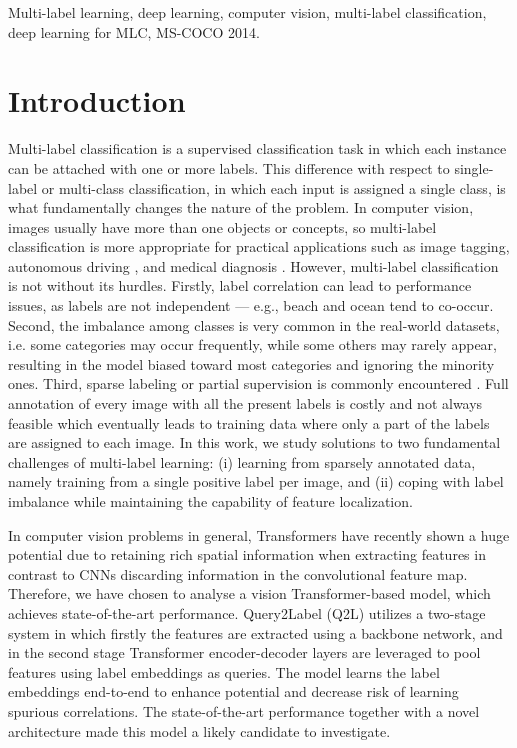 \documentclass[lettersize,journal]{IEEEtran}
\begin{document}
\begin{IEEEkeywords}
Multi-label learning, deep learning, computer vision, multi-label
classification, deep learning for MLC, MS-COCO 2014. 

\end{IEEEkeywords}


\section{Introduction}

Multi-label classification is a supervised classification task in which each instance can be attached with one or more labels. This difference with respect to single-label or multi-class classification, in which each input is assigned a single class, is what fundamentally changes the nature of the problem. In computer vision, images usually have more than one objects or concepts, so multi-label classification is more appropriate for practical applications such as image tagging, autonomous driving \cite{WU2024105189}, and medical diagnosis \cite{ge2018chestxraysclassificationmultilabel}.
However, multi-label classification is not without its hurdles. Firstly, label correlation can lead to performance issues, as labels are not independent — e.g., beach and ocean tend to co-occur. Second, the imbalance among classes is very common in the real-world datasets, i.e. some categories may occur frequently, while some others may rarely appear, resulting in the model biased toward most categories and ignoring the minority ones. Third, sparse labeling or partial supervision is commonly encountered \cite{mlsp}. Full annotation of every image with all the present labels is costly and not always feasible which eventually leads to training data where only a part of the labels are assigned to each image.
In this work, we study solutions to two fundamental challenges of multi-label learning: (i) learning from sparsely annotated data, namely training from a single positive label per image, and (ii) coping with label imbalance while maintaining the capability of feature localization. 

In computer vision problems in general, Transformers have recently shown a huge potential due to retaining rich spatial information when extracting features in contrast to CNNs discarding information in the convolutional feature map. Therefore, we have chosen to analyse a vision Transformer-based model, which achieves state-of-the-art performance. Query2Label (Q2L) utilizes a two-stage system in which firstly the features are extracted using a backbone network, and in the second stage Transformer encoder-decoder layers are leveraged to pool features using label embeddings as queries. The model learns the label embeddings end-to-end to enhance potential and decrease risk of learning spurious correlations. The state-of-the-art performance together with a novel architecture made this model a likely candidate to investigate. 
\end{document}
